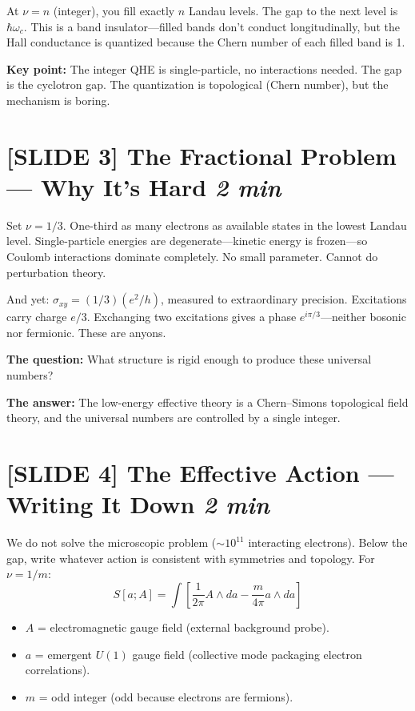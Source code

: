 \documentclass[11pt]{article}
\begin{document}
At $\nu = n$ (integer), you fill exactly $n$ Landau levels. The gap to the next level is $\hbar\omega_c$. This is a band insulator---filled bands don't conduct longitudinally, but the Hall conductance is quantized because the Chern number of each filled band is 1.

\textbf{Key point:} The integer QHE is single-particle, no interactions needed. The gap is the cyclotron gap. The quantization is topological (Chern number), but the mechanism is boring.

\section{[SLIDE 3] The Fractional Problem --- Why It's Hard \hfill \normalfont\textit{2 min}}

Set $\nu = 1/3$. One-third as many electrons as available states in the lowest Landau level. Single-particle energies are degenerate---kinetic energy is frozen---so Coulomb interactions dominate completely. No small parameter. Cannot do perturbation theory.

And yet: $\sigma_{xy} = (1/3)(e^2/h)$, measured to extraordinary precision. Excitations carry charge $e/3$. Exchanging two excitations gives a phase $e^{i\pi/3}$---neither bosonic nor fermionic. These are anyons.

\textbf{The question:} What structure is rigid enough to produce these universal numbers?

\textbf{The answer:} The low-energy effective theory is a Chern--Simons topological field theory, and the universal numbers are controlled by a single integer.

\section{[SLIDE 4] The Effective Action --- Writing It Down \hfill \normalfont\textit{2 min}}

We do not solve the microscopic problem ($\sim 10^{11}$ interacting electrons). Below the gap, write whatever action is consistent with symmetries and topology. For $\nu = 1/m$:
\begin{equation}\label{eq:action}
S[a; A] = \int \left[ \frac{1}{2\pi} A \wedge da - \frac{m}{4\pi} a \wedge da \right]
\end{equation}

\begin{itemize}[nosep]
\item $A$ = electromagnetic gauge field (external background probe).
\item $a$ = emergent $U(1)$ gauge field (collective mode packaging electron correlations).
\item $m$ = odd integer (odd because electrons are fermions).
\end{itemize}
\end{document}
